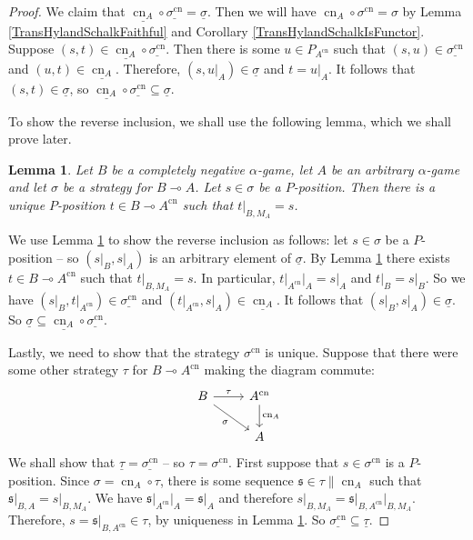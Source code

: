 \documentclass[11pt]{article} %
\theoremstyle{plain} %
\newtheorem{lemma}[theorem]{Lemma}
\theoremstyle{definition} %
\theoremstyle{note}
\theoremstyle{exercisestyle}
\renewcommand{\implies}{\multimap}
\newcommand{\comp}[2]{#1 \circ #2}
\newcommand{\s}{\mathfrak s}
\newcommand{\grel}[1]{\underline{#1}}
\DeclareMathOperator{\cn}{cn}
\renewcommand{\subset}{\subseteq}
\begin{document}
\begin{proof}
  We claim that $\comp{\grel{\cn_A}}{\grel{\sigma^{\cn}}}=\grel\sigma$.  Then we will have $\comp{\cn_A}{\sigma^{\cn}}=\sigma$ by Lemma \ref{TransHylandSchalkFaithful} and Corollary \ref{TransHylandSchalkIsFunctor}.  Suppose $(s,t)\in\comp{\grel{\cn_A}}{\grel{\sigma^{\cn}}}$.  Then there is some $u\in P_{A^{\cn}}$ such that $(s,u)\in\grel{\sigma^{\cn}}$ and $(u,t)\in\grel{\cn_A}$.  Therefore, $(s,u\vert_A)\in\grel\sigma$ and $t=u\vert_A$.  It follows that $(s,t)\in\grel{\sigma}$, so $\comp{\grel{\cn_A}}{\grel{\sigma^{\cn}}}\subset\grel\sigma$.  

  To show the reverse inclusion, we shall use the following lemma, which we shall prove later.  

  \begin{lemma}
    \label{CnLiftingLemma}
    Let $B$ be a completely negative $\alpha$-game, let $A$ be an arbitrary $\alpha$-game and let $\sigma$ be a strategy for $B\implies A$.  Let $s\in\sigma$ be a $P$-position.  Then there is a unique $P$-position $t\in B\implies A^{\cn}$ such that $t\vert_{B,M_A}=s$.
  \end{lemma}

  We use Lemma \ref{CnLiftingLemma} to show the reverse inclusion as follows: let $s\in\sigma$ be a $P$-position -- so $(s\vert_B,s\vert_A)$ is an arbitrary element of $\grel\sigma$.  By Lemma \ref{CnLiftingLemma} there exists $t\in B\implies A^{\cn}$ such that $t\vert_{B,M_A}=s$.  In particular, $t\vert_{A^{\cn}}\vert_A=s\vert_A$ and $t\vert_B=s\vert_B$.  So we have $(s\vert_B,t\vert_{A^{\cn}})\in\grel{\sigma^{\cn}}$ and $(t\vert_{A^{\cn}},s\vert_A)\in\grel{\cn_A}$.  It follows that $(s\vert_B,s\vert_A)\in\grel{\sigma}$.  So $\grel\sigma\subset\comp{\grel{\cn_A}}{\grel{\sigma^{\cn}}}$.  

  Lastly, we need to show that the strategy $\sigma^{\cn}$ is unique.  Suppose that there were some other strategy $\tau$ for $B\implies A^{\cn}$ making the diagram commute:
  \[
    \begin{tikzcd}
      B \arrow[r, "\tau"] \arrow[dr, "\sigma"']
        & A^{\cn} \arrow[d, "\cn_A"] \\
        & A
    \end{tikzcd}
    \]
  We shall show that $\grel\tau=\grel{\sigma^{\cn}}$ -- so $\tau=\sigma^{\cn}$.  First suppose that $s\in\sigma^{\cn}$ is a $P$-position.  Since $\sigma = \comp{\cn_A}{\tau}$, there is some sequence $\s\in\tau\|\cn_A$ such that $\s\vert_{B,A}=s\vert_{B,M_A}$.  We have $\s\vert_{A^{\cn}}\vert_A=\s\vert_A$ and therefore $s\vert_{B,M_A}=\s\vert_{B,A^{\cn}}\vert_{B,M_A}$.  Therefore, $s=\s\vert_{B,A^{\cn}}\in\tau$, by uniqueness in Lemma \ref{CnLiftingLemma}.  So $\grel{\sigma^{\cn}}\subset\grel{\tau}$.  


\end{proof}
\end{document}
